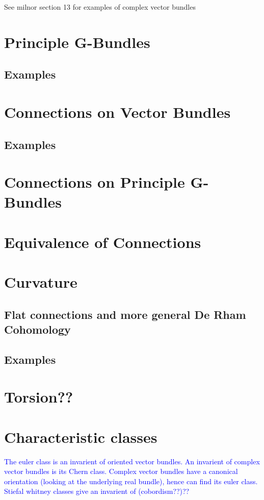 \documentclass[a4paper]{article}
\theoremstyle{definition} \newtheorem*{definition}{Definition}
\theoremstyle{definition} \newtheorem*{definitions}{Definitions}
\theoremstyle{plain} \newtheorem{theorem}{Theorem}[section]
\theoremstyle{plain} \newtheorem{proposition}[theorem]{Proposition}
\theoremstyle{plain} \newtheorem{corollary}[theorem]{Corollary}
\theoremstyle{plain} \newtheorem{lemma}[theorem]{Lemma}
\theoremstyle{plain} \newtheorem{example}[theorem]{Example}
\newcommand{\explainFurther}[1]{\textcolor{blue}{#1}}
\begin{document}
See milnor section 13 for examples of complex vector bundles

\section{Principle G-Bundles}

\subsection{Examples}

\section{Connections on Vector Bundles}

\subsection{Examples}

\section{Connections on Principle G-Bundles}

\section{Equivalence of Connections}

\section{Curvature}

\subsection{Flat connections and more general De Rham Cohomology}

\subsection{Examples}

\section{Torsion??}

\section{Characteristic classes}
\explainFurther{The euler class is an invarient of oriented vector bundles.}
\explainFurther{An invarient of complex vector bundles is its Chern class. Complex vector bundles have a canonical orientation (looking at the underlying real bundle), hence can find its euler class.}
\explainFurther{Stiefal whitney classes give an invarient of (cobordism??)??} 
\end{document}
